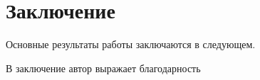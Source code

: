 \chapter*{Заключение}                       %


Основные результаты работы заключаются в следующем.


В заключение автор выражает благодарность 
